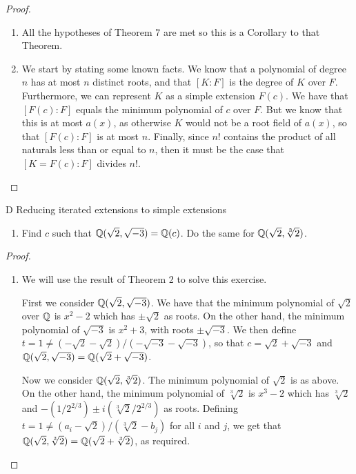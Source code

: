 \begin{proof}
\begin{enumerate}
    \item All the hypotheses of Theorem 7 are met so this is a Corollary to that Theorem.
    \item We start by stating some known facts. We know that a polynomial of degree $n$ has at most $n$ distinct roots, and that $[K:F]$ is the degree of $K$ over $F$. Furthermore, we can represent $K$ as a simple extension $F(c)$. We have that $[F(c):F]$ equals the minimum polynomial of $c$ over $F$. But we know that this is at most $a(x)$, as otherwise $K$ would not be a root field of $a(x)$, so that $[F(c):F]$ is at most $n$. Finally, since $n!$ contains the product of all naturals less than or equal to $n$, then it must be the case that $[K=F(c):F]$ divides $n!$.
 \end{enumerate}
\end{proof}

\begin{exercise}{D Reducing iterated extensions to simple extensions}
\begin{enumerate}
    \item Find $c$ such that $\mathbb{Q}(\sqrt{2},\sqrt{-3})=\mathbb{Q}(c)$. Do the same for $\mathbb{Q}(\sqrt{2},\sqrt[3]{2})$.
\end{enumerate}
\end{exercise}
\begin{proof}
 \begin{enumerate}
     \item We will use the result of Theorem 2 to solve this exercise. 
     
     First we consider $\mathbb{Q}(\sqrt{2},\sqrt{-3})$. We have that the minimum polynomial of $\sqrt{2}$ over $\mathbb{Q}$ is $x^2-2$ which has $\pm\sqrt{2}$ as roots. On the other hand, the minimum polynomial of $\sqrt{-3}$ is $x^2+3$, with roots $\pm\sqrt{-3}$. We then define $t=1\neq (-\sqrt{2}-\sqrt{2})/(-\sqrt{-3}-\sqrt{-3})$, so that $c=\sqrt{2}+\sqrt{-3}$ and $\mathbb{Q}(\sqrt{2},\sqrt{-3})=\mathbb{Q}(\sqrt{2}+\sqrt{-3})$.

     Now we consider $\mathbb{Q}(\sqrt{2},\sqrt[3]{2})$. The minimum polynomial of $\sqrt{2}$ is as above. On the other hand, the minimum polynomial of $\sqrt[3]{2}$ is $x^3-2$ which has $\sqrt[3]{2}$ and $-(1/2^{2/3})\pm i(\sqrt[3]{2}/2^{2/3})$ as roots. Defining $t=1\neq (a_i-\sqrt{2})/(\sqrt[3]{2}-b_j)$ for all $i$ and $j$, we get that $\mathbb{Q}(\sqrt{2},\sqrt[3]{2})=\mathbb{Q}(\sqrt{2}+\sqrt[3]{2})$, as required.
 \end{enumerate}
\end{proof}


